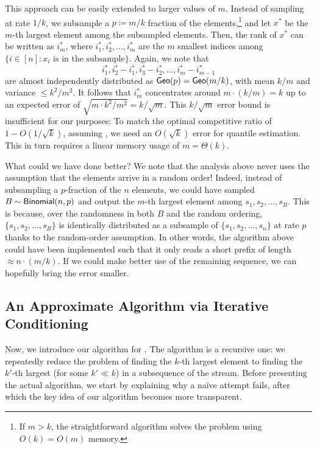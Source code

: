 This approach can be easily extended to larger values of $m$. Instead of sampling at rate $1/k$, we subsample a $p \coloneqq m/k$ fraction of the elements,\footnote{If $m > k$, the straightforward algorithm solves the problem using $O(k) = O(m)$ memory.} and let $x^*$ be the $m$-th largest element among the subsampled elements. Then, the rank of $x^*$ can be written as $i^*_m$, where $i^*_1, i^*_2, \ldots, i^*_m$ are the $m$ smallest indices among $\{i \in [n]: x_i\text{ is in the subsample}\}$. Again, we note that
\[
    i^*_1, i^*_2 - i^*_1, i^*_3 - i^*_2, \ldots, i^*_m - i^*_{m-1}
\]
are almost independently distributed as $\mathsf{Geo}(p) = \mathsf{Geo}(m/k)$, with mean $k/m$ and variance $\le k^2/m^2$. It follows that $i^*_m$ concentrates around $m\cdot (k/m) = k$ up to an expected error of $\sqrt{m\cdot k^2/m^2} = k/\sqrt{m}$. This $k/\sqrt{m}$ error bound is insufficient for our purposes: To match the optimal competitive ratio of $1 - O(1/\sqrt{k})$, assuming , we need an $O(\sqrt{k})$ error for quantile estimation. This in turn requires a linear memory usage of $m = \Theta(k)$.

What could we have done better? We note that the analysis above never uses the assumption that the elements arrive in a random order! Indeed, instead of subsampling a $p$-fraction of the $n$ elements, we could have sampled $B \sim \mathsf{Binomial}(n, p)$ and output the $m$-th largest element among $s_1, s_2, \ldots, s_B$. This is because, over the randomness in both $B$ and the random ordering, $\{s_1, s_2, \ldots, s_B\}$ is identically distributed as a subsample of $\{s_1, s_2, \ldots, s_n\}$ at rate $p$ thanks to the random-order assumption. In other words, the algorithm above could have been implemented such that it only reads a short prefix of length $\approx n\cdot(m/k)$. If we could make better use of the remaining sequence, we can hopefully bring the error smaller.

\subsection{An Approximate Algorithm via Iterative Conditioning}\label{sec:overview-approx}
Now, we introduce our algorithm for . The algorithm is a recursive one: we repeatedly reduce the problem of finding the $k$-th largest element to finding the $k'$-th largest (for some $k' \ll k$) in a subsequence of the stream. Before presenting the actual algorithm, we start by explaining why a na\"ive attempt fails, after which the key idea of our algorithm becomes more transparent.

